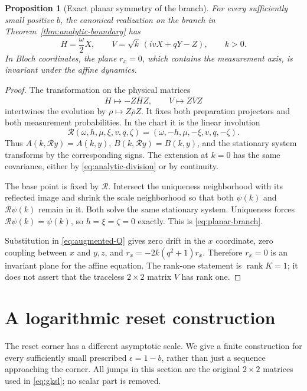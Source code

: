 \documentclass[11pt]{article}
\newtheorem{proposition}[theorem]{Proposition}
\theoremstyle{definition}
\theoremstyle{remark}
\DeclareMathOperator{\rank}{rank}
\begin{document}
\begin{proposition}[Exact planar symmetry of the branch]\label{prop:planarity}
For every sufficiently small positive \(b\), the canonical realization on the branch in Theorem~\ref{thm:analytic-boundary} has
\begin{equation}\label{eq:planar-branch}
 H=\frac\omega2X,\qquad
 V=\sqrt{k}\,(ivX+qY-Z),\qquad k>0.
\end{equation}
In Bloch coordinates, the plane \(r_x=0\), which contains the measurement axis, is invariant under the affine dynamics.
\end{proposition}
\begin{proof}
The transformation on the physical matrices
\[
 H\longmapsto-Z\overline HZ,\qquad V\longmapsto Z\overline VZ
\]
intertwines the evolution by \(\rho\mapsto Z\overline\rho Z\). It fixes both preparation projectors and both measurement probabilities. In the chart it is the linear involution
\[
 \mathcal R(\omega,h,\mu,\xi,v,q,\zeta)
 =(\omega,-h,\mu,-\xi,v,q,-\zeta).
\]
Thus \(A(k,\mathcal Ry)=A(k,y)\), \(B(k,\mathcal Ry)=B(k,y)\), and the stationary system transforms by the corresponding signs. The extension at \(k=0\) has the same covariance, either by \eqref{eq:analytic-division} or by continuity.

The base point is fixed by \(\mathcal R\). Intersect the uniqueness neighborhood with its reflected image and shrink the scale neighborhood so that both \(\psi(k)\) and \(\mathcal R\psi(k)\) remain in it. Both solve the same stationary system. Uniqueness forces \(\mathcal R\psi(k)=\psi(k)\), so \(h=\xi=\zeta=0\) exactly. This is \eqref{eq:planar-branch}.

Substitution in \eqref{eq:augmented-Q} gives zero drift in the \(x\) coordinate, zero coupling between \(x\) and \(y,z\), and
\(\dot r_x=-2k(q^2+1)r_x\). Therefore \(r_x=0\) is an invariant plane for the affine equation. The rank-one statement is \(\rank K=1\); it does not assert that the traceless \(2\times2\) matrix \(V\) has rank one.
\end{proof}





\section{A logarithmic reset construction}\label{sec:reset}

The reset corner has a different asymptotic scale. We give a finite construction for every sufficiently small prescribed \(\epsilon=1-b\), rather than just a sequence approaching the corner. All jumps in this section are the original \(2\times2\) matrices used in \eqref{eq:gksl}; no scalar part is removed.
\end{document}
